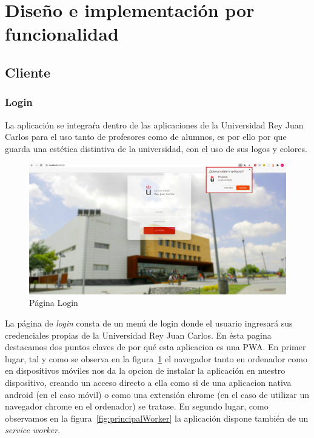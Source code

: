 \documentclass[a4paper, 12pt]{book}
\begin{document}
\section{Diseño e implementación por funcionalidad } 

\subsection{Cliente}

\subsubsection{Login}
	La aplicación se integraŕa dentro de las aplicaciones de la Universidad Rey Juan Carlos para el uso tanto de profesores como de alumnos, es por ello por que guarda una estética distintiva de la universidad, con el uso de sus logos y colores.
	\begin{figure}[H]
  	\centering
  	\includegraphics[width=16cm, keepaspectratio]{img/principalHome.png}
  	\caption{Página Login}\label{fig:principalHome}
	\end{figure}
La página de \textit{login} consta de un menú de login donde el usuario ingresará sus credenciales propias de la Universidad Rey Juan Carlos. En ésta pagina destacamos dos puntos claves de por qué esta aplicacion es una PWA.
	En primer lugar, tal y como se observa en la figura~\ref{fig:principalHome} el navegador tanto en ordenador como en dispositivos móviles nos da la opcion de instalar la aplicación en nuestro dispositivo, creando un acceso directo a ella como si de una aplicacion nativa android (en el caso móvil) o como una extensión chrome (en el caso de utilizar un navegador chrome en el ordenador) se tratase.
	En segundo lugar, como observamos en la figura~\ref{fig:principalWorker} la aplicación dispone también de un \textit{service worker}.
	
\end{document}
